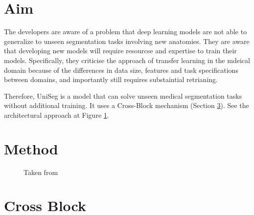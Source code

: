 \documentclass[11pt]{article}
\begin{document}


\tableofcontents

\clearpage

\section{Aim}

The developers are aware of a problem that deep learning models are not able to generalize to unseen segmentation tasks involving new anatomies. They are aware that developing new models will require resourcse and expertise to train their models. Specifically, they criticise the approach of transfer learning in the mdeical domain because of the differences in data size, features and task specifications between domains, and importantly still requires substaintial retrianing. 

\vspace{1em}

Therefore, UniSeg is a model that can solve unseen medical segmentation tasks without additional training. It uses a Cross-Block mechanism (Section \ref{sec:cross-block}). See the architectural approach at Figure \ref{fig:arch-comparison}.

\section{Method}

\begin{figure}[H]
    \centering
    \caption{Taken from~\cite{universeg}}\label{fig:arch-comparison}
\end{figure}



\section{Cross Block} \label{sec:cross-block}

\printbibliography
\end{document}

